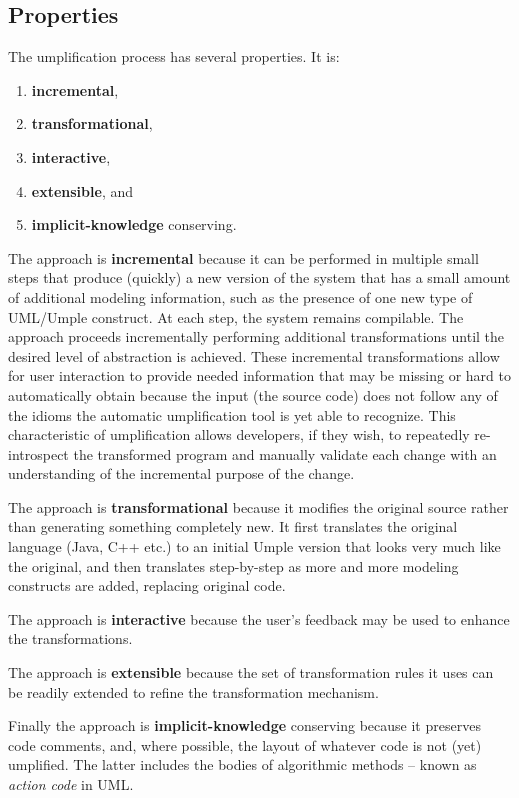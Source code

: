 \subsection{Properties}

The umplification process has several properties. It is:
\begin{enumerate}
 \item \textbf{incremental}, 
 \item \textbf{transformational},
 \item \textbf{interactive},  
 \item \textbf{extensible}, and
 \item \textbf{implicit-knowledge} conserving. 
\end{enumerate}

The approach is \textbf{incremental} because it can be performed in multiple small steps that produce (quickly) a new version of the system that has a small amount of additional modeling information, such as the presence of one new type of UML/Umple construct. At each step, the system remains compilable. The approach proceeds incrementally performing additional transformations until the desired level of abstraction is achieved.	These incremental transformations allow for user interaction to provide needed information that may be missing or hard to automatically obtain because the input (the source code) does not follow any of the idioms the automatic umplification tool is yet able to recognize. This characteristic of umplification allows developers, if they wish, to repeatedly re-introspect the transformed program and manually validate each change with an understanding of the incremental purpose of the change.

The approach is \textbf{transformational} because it modifies the original source rather than generating something completely new. It first translates the original language (Java, C++ etc.) to an initial Umple version that looks very much like the original, and then translates step-by-step as more and more modeling constructs are added, replacing original code.

The approach is \textbf{interactive} because the user's feedback may be used to enhance the transformations.

The approach is \textbf{extensible} because the set of transformation rules it uses can be readily extended to refine the transformation mechanism. 

Finally the approach is \textbf{implicit-knowledge} conserving because it preserves code comments, and, where possible, the layout of whatever code is not (yet) umplified. The latter includes the bodies of algorithmic methods – known as \textit{action code} in UML.

